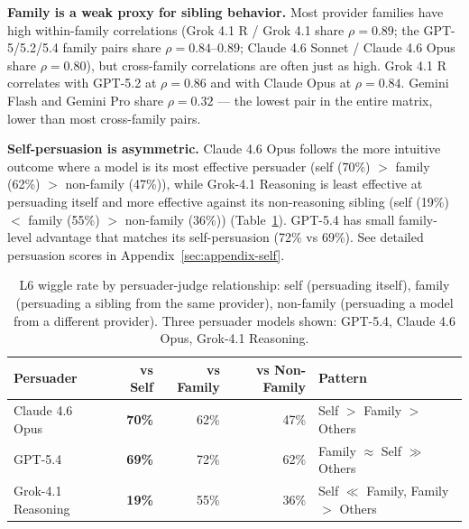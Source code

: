 \textbf{Family is a weak proxy for sibling behavior.} Most provider families have high within-family correlations (Grok 4.1 R / Grok 4.1 share $\rho = 0.89$; the GPT-5/5.2/5.4 family pairs share $\rho = 0.84$--$0.89$; 
Claude 4.6 Sonnet / Claude 4.6 Opus share $\rho = 0.80$),
but cross-family correlations are often just as high.
Grok 4.1 R correlates with GPT-5.2 at $\rho = 0.86$ and with Claude Opus at $\rho = 0.84$. Gemini Flash and Gemini Pro 
share $\rho = 0.32$ --- the lowest pair in the entire matrix, lower than most cross-family pairs.

\textbf{Self-persuasion is asymmetric.} Claude 4.6 Opus follows the more intuitive outcome where a model is its most 
effective persuader (self (70\%) $>$ family (62\%) $>$ non-family (47\%)), while Grok-4.1 Reasoning is least effective
at persuading itself and more effective against its non-reasoning sibling (self (19\%) $<$ family (55\%) $>$ non-family (36\%)) (Table~\ref{tab:self-persuasion}). 
GPT-5.4 has small family-level advantage that matches its self-persuasion (72\% vs 69\%). See detailed persuasion scores in Appendix~\ref{sec:appendix-self}.

\begin{table}[t]
\centering
\small
\caption{L6 wiggle rate by persuader-judge relationship: self (persuading itself), family (persuading a sibling from the 
same provider), non-family (persuading a model from a different provider). Three persuader models shown: GPT-5.4, 
Claude 4.6 Opus, Grok-4.1 Reasoning.}
\label{tab:self-persuasion}
\begin{tabular}{@{}lrrrl@{}}
\toprule
\textbf{Persuader} & \textbf{vs Self} & \textbf{vs Family} & \textbf{vs Non-Family} & \textbf{Pattern} \\
\midrule
Claude 4.6 Opus    & \textbf{70\%} & 62\% & 47\% & Self $>$ Family $>$ Others \\
GPT-5.4            & \textbf{69\%} & 72\% & 62\% & Family $\approx$ Self $\gg$ Others \\
Grok-4.1 Reasoning & \textbf{19\%} & 55\% & 36\% & Self $\ll$ Family, Family $>$ Others \\
\bottomrule
\end{tabular}
\end{table}
